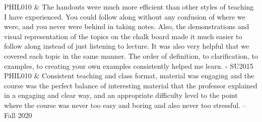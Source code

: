 \documentclass[p1noheader, 11pt]{../lightcv}
\begin{document}
\begin{dated}
    PHIL010 & The handouts were much more efficient than other styles of teaching I have experienced. You could follow along without any confusion of where we were, and you never were behind in taking notes. Also, the demonstrations and visual representation of the topics on the chalk board made it much easier to follow along instead of just listening to lecture. It was also very helpful that we covered each topic in the same manner. The order of definition, to clarification, to examples, to creating your own examples consistently helped me learn. - SU2015\\

    PHIL010 & Consistent teaching and class format, material was engaging and the course was the perfect balance of interesting material that the professor explained in a engaging and clear way, and an appropriate difficulty level to the point where the course was never too easy and boring and also never too stressful. – Fall 2020\\


\end{dated}
\end{document}
